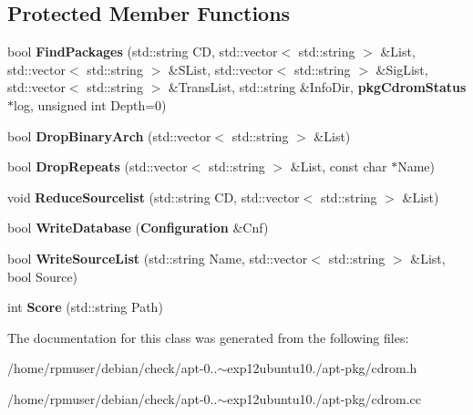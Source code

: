 \subsection*{\-Protected \-Member \-Functions}
\begin{DoxyCompactItemize}
\item 
bool {\bfseries \-Find\-Packages} (std\-::string \-C\-D, std\-::vector$<$ std\-::string $>$ \&\-List, std\-::vector$<$ std\-::string $>$ \&\-S\-List, std\-::vector$<$ std\-::string $>$ \&\-Sig\-List, std\-::vector$<$ std\-::string $>$ \&\-Trans\-List, std\-::string \&\-Info\-Dir, {\bf pkg\-Cdrom\-Status} $\ast$log, unsigned int \-Depth=0)\label{classpkgCdrom_a5b069d4382ad208094fbd8aaec83d4e5}

\item 
bool {\bfseries \-Drop\-Binary\-Arch} (std\-::vector$<$ std\-::string $>$ \&\-List)\label{classpkgCdrom_ac6f8c03ba87340ad0c31e1fea9c02398}

\item 
bool {\bfseries \-Drop\-Repeats} (std\-::vector$<$ std\-::string $>$ \&\-List, const char $\ast$\-Name)\label{classpkgCdrom_a7913f2b115eb86bad73ac60c4b35996b}

\item 
void {\bfseries \-Reduce\-Sourcelist} (std\-::string \-C\-D, std\-::vector$<$ std\-::string $>$ \&\-List)\label{classpkgCdrom_aa72ade02e02fa276f8d13ed1251a2b85}

\item 
bool {\bfseries \-Write\-Database} ({\bf \-Configuration} \&\-Cnf)\label{classpkgCdrom_a61612e5b5e2d2b87351bfcc94d7be29e}

\item 
bool {\bfseries \-Write\-Source\-List} (std\-::string \-Name, std\-::vector$<$ std\-::string $>$ \&\-List, bool \-Source)\label{classpkgCdrom_ab996d15296b7a3721927f7badba3f9b0}

\item 
int {\bfseries \-Score} (std\-::string \-Path)\label{classpkgCdrom_aeba517198639eed5c048d568240d2c46}

\end{DoxyCompactItemize}


\-The documentation for this class was generated from the following files\-:\begin{DoxyCompactItemize}
\item 
/home/rpmuser/debian/check/apt-\/0..$\sim$exp12ubuntu10./apt-\/pkg/cdrom.\-h\item 
/home/rpmuser/debian/check/apt-\/0..$\sim$exp12ubuntu10./apt-\/pkg/cdrom.\-cc\end{DoxyCompactItemize}
